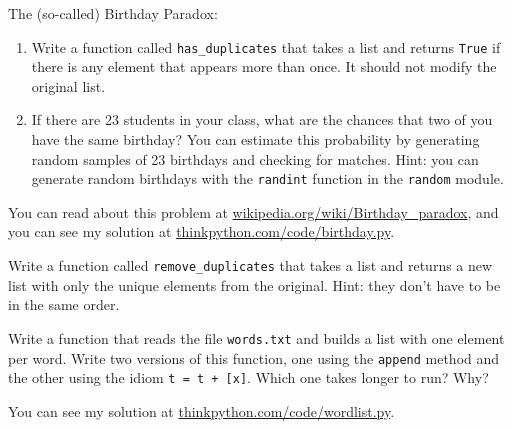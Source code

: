 \documentclass[10pt]{book}
\begin{document}
\begin{ex}
\label{duplicate}

The (so-called) Birthday Paradox:

\begin{enumerate}


\item Write a function called \verb"has_duplicates" that takes
a list and returns {\tt True} if there is any element that
appears more than once.  It should not modify the original
list.

\item If there are 23 students in your class, what are the chances
that two of you have the same birthday?  You can estimate this
probability by generating random samples of 23 birthdays
and checking for matches.  Hint: you can generate random birthdays
with the {\tt randint} function in the {\tt random} module.


\end{enumerate}

You can read about this problem at
\url{wikipedia.org/wiki/Birthday_paradox}, and you can see my solution
at \url{thinkpython.com/code/birthday.py}.

\end{ex}


\begin{ex}


Write a function called \verb"remove_duplicates" that takes
a list and returns a new list with only the unique elements from
the original.  Hint: they don't have to be in the same order.
\end{ex}


\begin{ex}

Write a function that reads the file {\tt words.txt} and builds
a list with one element per word.  Write two versions of
this function, one using the {\tt append} method and the
other using the idiom {\tt t = t + [x]}.  Which one takes
longer to run?  Why?

You can see my solution at \url{thinkpython.com/code/wordlist.py}.
\end{ex}
\end{document}
